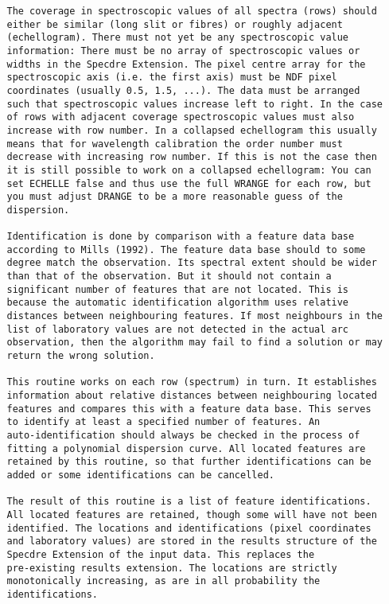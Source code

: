 \begin{description}
\begin{verbatim}
   The coverage in spectroscopic values of all spectra (rows) should
   either be similar (long slit or fibres) or roughly adjacent
   (echellogram). There must not yet be any spectroscopic value
   information: There must be no array of spectroscopic values or
   widths in the Specdre Extension. The pixel centre array for the
   spectroscopic axis (i.e. the first axis) must be NDF pixel
   coordinates (usually 0.5, 1.5, ...). The data must be arranged
   such that spectroscopic values increase left to right. In the case
   of rows with adjacent coverage spectroscopic values must also
   increase with row number. In a collapsed echellogram this usually
   means that for wavelength calibration the order number must
   decrease with increasing row number. If this is not the case then
   it is still possible to work on a collapsed echellogram: You can
   set ECHELLE false and thus use the full WRANGE for each row, but
   you must adjust DRANGE to be a more reasonable guess of the
   dispersion.

   Identification is done by comparison with a feature data base
   according to Mills (1992). The feature data base should to some
   degree match the observation. Its spectral extent should be wider
   than that of the observation. But it should not contain a
   significant number of features that are not located. This is
   because the automatic identification algorithm uses relative
   distances between neighbouring features. If most neighbours in the
   list of laboratory values are not detected in the actual arc
   observation, then the algorithm may fail to find a solution or may
   return the wrong solution.

   This routine works on each row (spectrum) in turn. It establishes
   information about relative distances between neighbouring located
   features and compares this with a feature data base. This serves
   to identify at least a specified number of features. An
   auto-identification should always be checked in the process of
   fitting a polynomial dispersion curve. All located features are
   retained by this routine, so that further identifications can be
   added or some identifications can be cancelled.

   The result of this routine is a list of feature identifications.
   All located features are retained, though some will have not been
   identified. The locations and identifications (pixel coordinates
   and laboratory values) are stored in the results structure of the
   Specdre Extension of the input data. This replaces the
   pre-existing results extension. The locations are strictly
   monotonically increasing, as are in all probability the
   identifications.


\end{verbatim}
\end{description}
